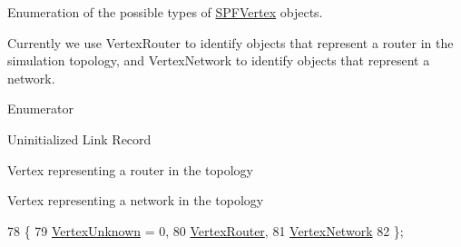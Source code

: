 Enumeration of the possible types of \hyperlink{classns3_1_1SPFVertex}{S\+P\+F\+Vertex} objects. 

Currently we use Vertex\+Router to identify objects that represent a router in the simulation topology, and Vertex\+Network to identify objects that represent a network. \begin{Desc}
\item[Enumerator]\par
\begin{description}
\item[{\em 
Vertex\+Unknown\hypertarget{classns3_1_1SPFVertex_a20f8a4cfc99a1b7ecd10a23151b93afdaf0e999939533bcbb83b6cb9bf4b37a20}{}\label{classns3_1_1SPFVertex_a20f8a4cfc99a1b7ecd10a23151b93afdaf0e999939533bcbb83b6cb9bf4b37a20}
}]Uninitialized Link Record \item[{\em 
Vertex\+Router\hypertarget{classns3_1_1SPFVertex_a20f8a4cfc99a1b7ecd10a23151b93afda340822983a2833fff14de88ea20a3f31}{}\label{classns3_1_1SPFVertex_a20f8a4cfc99a1b7ecd10a23151b93afda340822983a2833fff14de88ea20a3f31}
}]Vertex representing a router in the topology \item[{\em 
Vertex\+Network\hypertarget{classns3_1_1SPFVertex_a20f8a4cfc99a1b7ecd10a23151b93afda00415acb788d8d95bee545fe2046c2a8}{}\label{classns3_1_1SPFVertex_a20f8a4cfc99a1b7ecd10a23151b93afda00415acb788d8d95bee545fe2046c2a8}
}]Vertex representing a network in the topology \end{description}
\end{Desc}

\begin{DoxyCode}
78                   \{
79     \hyperlink{classns3_1_1SPFVertex_a20f8a4cfc99a1b7ecd10a23151b93afdaf0e999939533bcbb83b6cb9bf4b37a20}{VertexUnknown} = 0,  
80     \hyperlink{classns3_1_1SPFVertex_a20f8a4cfc99a1b7ecd10a23151b93afda340822983a2833fff14de88ea20a3f31}{VertexRouter},       
81     \hyperlink{classns3_1_1SPFVertex_a20f8a4cfc99a1b7ecd10a23151b93afda00415acb788d8d95bee545fe2046c2a8}{VertexNetwork}       
82   \};
\end{DoxyCode}



